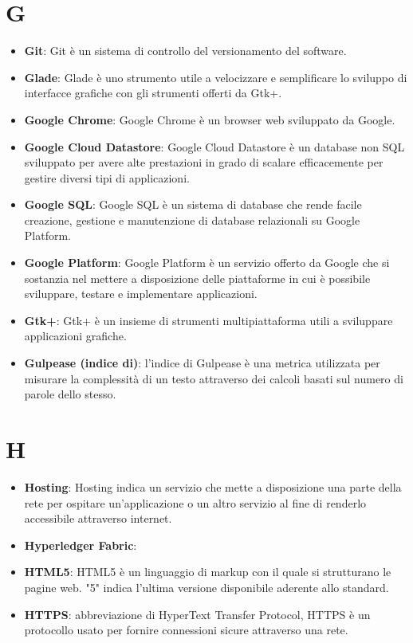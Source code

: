 \documentclass[a4paper, oneside, openany]{article}
\begin{document}
\section{G}
\begin{itemize}
\item \textbf{Git}: Git è un sistema di controllo del versionamento del software.
\item \textbf{Glade}: Glade è uno strumento utile a velocizzare e semplificare lo sviluppo di interfacce grafiche con gli strumenti offerti da Gtk+.
\item \textbf{Google Chrome}: Google Chrome è un browser web sviluppato da Google.
\item \textbf{Google Cloud Datastore}: Google Cloud Datastore è un database non SQL sviluppato per avere alte prestazioni in grado di scalare efficacemente per gestire diversi tipi di applicazioni.
\item \textbf{Google SQL}: Google SQL è un sistema di database che rende facile creazione, gestione e manutenzione di database relazionali su Google Platform.
\item \textbf{Google Platform}: Google Platform è un servizio offerto da Google che si sostanzia nel mettere a disposizione delle piattaforme in cui è possibile sviluppare, testare e implementare applicazioni.
\item \textbf{Gtk+}: Gtk+ è un insieme di strumenti multipiattaforma utili a sviluppare applicazioni grafiche.
\item \textbf{Gulpease (indice di)}: l'indice di Gulpease è una metrica utilizzata per misurare la complessità di un testo attraverso dei calcoli basati sul numero di parole dello stesso.
\end{itemize}

\section{H}
\begin{itemize}
\item \textbf{Hosting}: Hosting indica un servizio che mette a disposizione una parte della rete per ospitare un'applicazione o un altro servizio al fine di renderlo accessibile attraverso internet.
\item \textbf{Hyperledger Fabric}:	
\item \textbf{HTML5}: HTML5 è un linguaggio di markup con il quale si strutturano le pagine web. "5" indica l'ultima versione disponibile aderente allo standard.
\item \textbf{HTTPS}: abbreviazione di HyperText Transfer Protocol, HTTPS è un protocollo usato per fornire connessioni sicure attraverso una rete.
\end{itemize}
\end{document}
